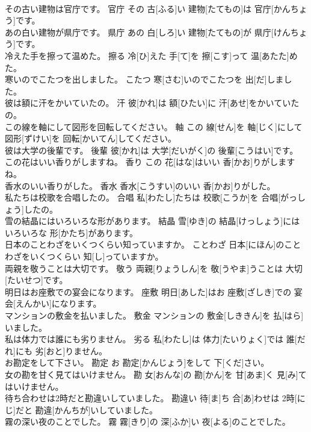 \documentclass[8pt]{extreport}
\begin{document}
\begin{CJK}{UTF8}{min}
\\	その古い建物は官庁です。	官庁	その 古[ふる]い 建物[たてもの]は 官庁[かんちょう]です。	
\\	あの白い建物が県庁です。	県庁	あの 白[しろ]い 建物[たてもの]が 県庁[けんちょう]です。	
\\	冷えた手を擦って温めた。	擦る	冷[ひ]えた 手[て]を 擦[こす]って 温[あたた]めた。	
\\	寒いのでこたつを出しました。	こたつ	寒[さむ]いのでこたつを 出[だ]しました。	
\\	彼は額に汗をかいていたの。	汗	彼[かれ]は 額[ひたい]に 汗[あせ]をかいていたの。	
\\	この線を軸にして図形を回転してください。	軸	この 線[せん]を 軸[じく]にして 図形[ずけい]を 回転[かいてん]してください。	
\\	彼は大学の後輩です。	後輩	彼[かれ]は 大学[だいがく]の 後輩[こうはい]です。	
\\	この花はいい香りがしますね。	香り	この 花[はな]はいい 香[かお]りがしますね。	
\\	香水のいい香りがした。	香水	香水[こうすい]のいい 香[かお]りがした。	
\\	私たちは校歌を合唱したの。	合唱	私[わたし]たちは 校歌[こうか]を 合唱[がっしょう]したの。	
\\	雪の結晶にはいろいろな形があります。	結晶	雪[ゆき]の 結晶[けっしょう]にはいろいろな 形[かたち]があります。	
\\	日本のことわざをいくつくらい知っていますか。	ことわざ	日本[にほん]のことわざをいくつくらい 知[し]っていますか。	
\\	両親を敬うことは大切です。	敬う	両親[りょうしん]を 敬[うやま]うことは 大切[たいせつ]です。	
\\	明日はお座敷での宴会になります。	座敷	明日[あした]はお 座敷[ざしき]での 宴会[えんかい]になります。	
\\	マンションの敷金を払いました。	敷金	マンションの 敷金[しききん]を 払[はら]いました。	
\\	私は体力では誰にも劣りません。	劣る	私[わたし]は 体力[たいりょく]では 誰[だれ]にも 劣[おと]りません。	
\\	お勘定をして下さい。	勘定	お 勘定[かんじょう]をして 下[くだ]さい。	
\\	女の勘を甘く見てはいけません。	勘	女[おんな]の 勘[かん]を 甘[あま]く 見[み]てはいけません。	
\\	待ち合わせは2時だと勘違いしていました。	勘違い	待[ま]ち 合[あ]わせは 2時[にじ]だと 勘違[かんちが]いしていました。	
\\	霧の深い夜のことでした。	霧	霧[きり]の 深[ふか]い 夜[よる]のことでした。	

\end{CJK}
\end{document}

